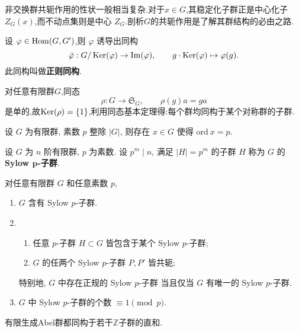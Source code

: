 非交换群共轭作用的性状一般相当复杂.对于$x \in G$,其稳定化子群正是中心化子$Z_G(x)$,而不动点集则是中心 $Z_G$.剖析$G$的共轭作用是了解其群结构的必由之路.
\begin{theorem}[同态基本定理]\label{thm:1st-homomorphism}
	设 $\varphi\in\operatorname{\mathrm{Hom}}(G, G')$,则 $\varphi$ 诱导出同构
	\[
	\bar{\varphi}: G/\operatorname{\mathrm{Ker}}(\varphi) \to \operatorname{\mathrm{Im}}(\varphi),\qquad g \cdot \operatorname{\mathrm{Ker}}(\varphi)\mapsto\varphi(g).
	\]
	此同构叫做\textbf{正则同构}.
\end{theorem}
\begin{theorem}[Caylay定理]\label{thm:Caylay}
	对任意有限群$G$,同态
	\[
	\rho:G\to \mathfrak{S}_G,\qquad\rho(g)a=ga
	\]
	是单的,故$\operatorname{\mathrm{Ker}}(\rho)=\{1\}$,利用同态基本定理得:每个群均同构于某个对称群的子群.
\end{theorem}
\begin{theorem}[Cauchy 定理]\label{thm:group-Cauchy}
	设 $G$ 为有限群, 素数 $p$ 整除 $|G|$, 则存在 $x \in G$ 使得 $\mathrm{ord}\ x=p$.
\end{theorem}
\begin{definition}
设 $G$ 为 $n$ 阶有限群, $p$ 为素数. 设 $p^m \mid n$, 满足 $|H| = p^m$ 的子群 $H$ 称为 $G$ 的 \textbf{Sylow $\bm{p}$-子群}.
\end{definition}
\begin{theorem}[Sylow 定理]对任意有限群 $G$ 和任意素数 $p$, 
	\begin{enumerate}
		\item $G$ 含有 Sylow $p$-子群.
		\item 
		\begin{enumerate}
			\item 任意 $p$-子群 $H \subset G$ 皆包含于某个 Sylow $p$-子群;
			\item $G$ 的任两个 Sylow $p$-子群 $P, P'$ 皆共轭;
		\end{enumerate}
		特别地, $G$ 中存在正规的 Sylow $p$-子群 当且仅当 $G$ 有唯一的 Sylow $p$-子群.
		\item $G$ 中 Sylow $p$-子群的个数 $\equiv 1 \pmod p$.
	\end{enumerate}
\end{theorem}
\begin{theorem}[有限生成Abel群结构定理]\label{thm:finitely generated Abel}
	有限生成Abel群都同构于若干$\mathbb{Z}$子群的直和.
\end{theorem}
